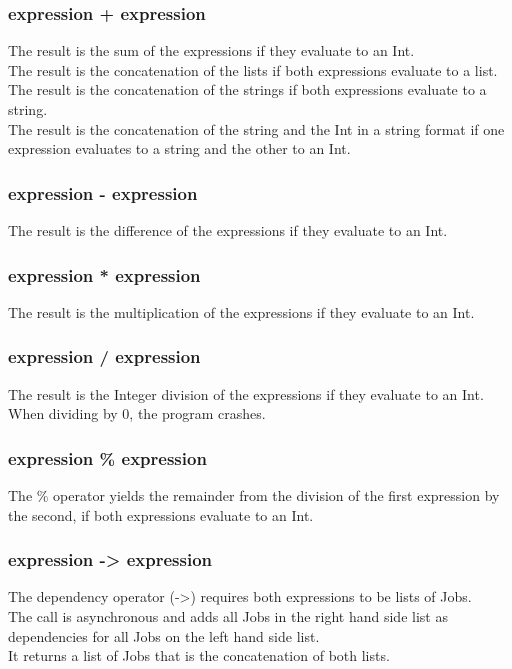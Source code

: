 \documentclass[12pt]{article}
\begin{document}
\subsubsection{expression + expression}
The result is the sum of the expressions if they evaluate to an Int.\\
The result is the concatenation of the lists if both expressions evaluate to
a list.\\
The result is the concatenation of the strings if both expressions evaluate to
a string.\\
The result is the concatenation of the string and the Int in a string format if
one expression evaluates to a string and the other to an Int.\\

\subsubsection{expression - expression}
The result is the difference of the expressions if they evaluate to an Int.

\subsubsection{expression * expression}
The result is the multiplication of the expressions if they evaluate to an Int.

\subsubsection{expression / expression}
The result is the Integer division of the expressions if they evaluate to an Int.\\
When dividing by 0, the program crashes.

\subsubsection{expression \% expression}
The \% operator yields the remainder from the division of the first expression by the second, if
both expressions evaluate to an Int.

\subsubsection{expression -> expression}
The dependency operator (->) requires both expressions to be lists of Jobs.\\
The call is asynchronous and adds all Jobs in the right hand side list as dependencies
for all Jobs on the left hand side list.\\
It returns a list of Jobs that is the concatenation of both lists.
\end{document}

